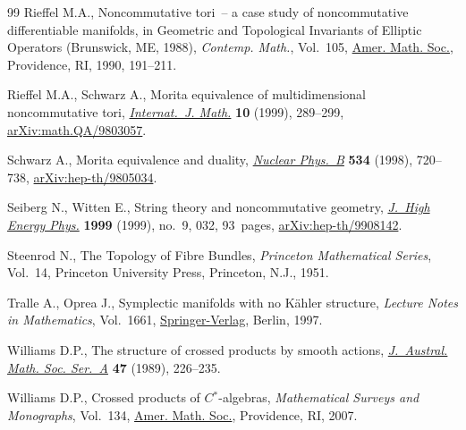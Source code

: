 \documentclass[pdftex]{sigma}
\numberwithin{equation}{section}
\begin{document}
\begin{thebibliography}{99}
Rieffel M.A., Noncommutative tori~-- a case study of noncommutative
 differentiable manifolds, in Geometric and Topological Invariants of Elliptic
 Operators ({B}runswick, {ME}, 1988), \textit{Contemp. Math.}, Vol.~105, \href{https://doi.org/10.1090/conm/105/1047281}{Amer.
 Math. Soc.}, Providence, RI, 1990, 191--211.

Rieffel M.A., Schwarz A., Morita equivalence of multidimensional noncommutative
 tori, \href{https://doi.org/10.1142/S0129167X99000100}{\textit{Internat.~J. Math.}} \textbf{10} (1999), 289--299,
 \href{https://arxiv.org/abs/math.QA/9803057}{arXiv:math.QA/9803057}.

Schwarz A., Morita equivalence and duality, \href{https://doi.org/10.1016/S0550-3213(98)00550-1}{\textit{Nuclear Phys.~B}}
 \textbf{534} (1998), 720--738, \href{https://arxiv.org/abs/hep-th/9805034}{arXiv:hep-th/9805034}.

Seiberg N., Witten E., String theory and noncommutative geometry,
 \href{https://doi.org/10.1088/1126-6708/1999/09/032}{\textit{J.~High Energy Phys.}} \textbf{1999} (1999), no.~9, 032, 93~pages,
 \href{https://arxiv.org/abs/hep-th/9908142}{arXiv:hep-th/9908142}.

Steenrod N., The {T}opology of {F}ibre {B}undles, \textit{Princeton Mathematical
 Series}, Vol.~14, Princeton University Press, Princeton, N.J., 1951.

Tralle A., Oprea J., Symplectic manifolds with no {K}\"ahler structure,
 \textit{Lecture Notes in Mathematics}, Vol.~1661, \href{https://doi.org/10.1007/BFb0092608}{Springer-Verlag}, Berlin,
 1997.

Williams D.P., The structure of crossed products by smooth actions,
 \href{https://doi.org/10.1017/S1446788700031657}{\textit{J.~Austral. Math. Soc. Ser.~A}} \textbf{47} (1989), 226--235.

Williams D.P., Crossed products of {$C{^\ast}$}-algebras, \textit{Mathematical
 Surveys and Monographs}, Vol.~134, \href{https://doi.org/10.1090/surv/134}{Amer. Math. Soc.}, Providence, RI, 2007.

\end{thebibliography}\LastPageEnding
\end{document}

